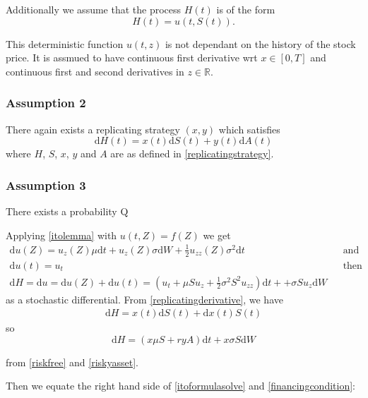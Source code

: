 \documentclass[11pt]{article} %
\begin{document}
Additionally we assume that the process $H(t)$ is of  the form 
\begin{equation}
    H(t) = u(t, S(t)).
\end{equation}

This deterministic function $u(t,z)$ is not dependant on the history of the stock price. 
It is assmued to have continuous first derivative wrt $x \in [0,T]$ and continuous first 
and second derivatives in $z \in \mathbb{R}$.

\subsubsection{Assumption 2}
There again exists a replicating strategy $(x,y)$ which satisfies 
\begin{equation}\label{replicatingderivative}
    \mathrm{d} H(t) = x(t)\mathrm{d} S(t) + y(t)\mathrm{d} A(t)
\end{equation}
where $H$, $S$, $x$, $y$ and $A$ are as defined in \ref{replicatingstrategy}.
\subsubsection{Assumption 3}
There exists a probability Q


Applying \ref{itolemma} with $u(t,Z) = f(Z)$ we get   
\begin{align}\label{itoformulasolve}
    \mathrm{d}u(Z)  = u_z(Z)\mu \mathrm{d}t + u_z(Z)\sigma \mathrm{d}W + \frac{1}{2}
    u_{zz}(Z) \sigma^2 \mathrm{d}t&& \text{and} \\
    \mathrm{d}u(t) = u_t &&\text{then} \\
    \mathrm{d}H =\mathrm{d}u = \mathrm{d}u(Z) +\mathrm{d}u(t) =   (u_t + \mu S u_z + \frac{1}{2} 
    \sigma^2 S^2 u_{zz})\mathrm{d}t + +\sigma S u_z \mathrm{d}W
\end{align}
as a stochastic differential.
From \ref{replicatingderivative}, we have
\begin{align}
    \mathrm{d}H = x(t)\mathrm{d}S(t) +\mathrm{d}x(t)S(t) 
\end{align}
so
\begin{equation}\label{financingcondition}
    \mathrm{d}H = (x\mu S + ryA)\mathrm{d}t + x \sigma S \mathrm{d}W 
\end{equation}

from \ref{riskfree} and \ref{riskyasset}.

Then we equate the right hand side of \ref{itoformulasolve} and \ref{financingcondition}:
\end{document}
